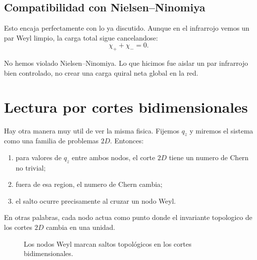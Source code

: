 \subsection{Compatibilidad con Nielsen--Ninomiya}
Esto encaja perfectamente con lo ya discutido. Aunque en el infrarrojo vemos un par Weyl limpio, la carga total sigue cancelandose:
\begin{equation}
\chi_+ + \chi_- = 0.
\end{equation}

No hemos violado Nielsen--Ninomiya. Lo que hicimos fue aislar un par infrarrojo bien controlado, no crear una carga quiral neta global en la red.

\section{Lectura por cortes bidimensionales}
Hay otra manera muy util de ver la misma fisica. Fijemos \(q_z\) y miremos el sistema como una familia de problemas \(2D\). Entonces:
\begin{enumerate}[label=\arabic*.]
    \item para valores de \(q_z\) entre ambos nodos, el corte \(2D\) tiene un numero de Chern no trivial;
    \item fuera de esa region, el numero de Chern cambia;
    \item el salto ocurre precisamente al cruzar un nodo Weyl.
\end{enumerate}

En otras palabras, cada nodo actua como punto donde el invariante topologico de los cortes \(2D\) cambia en una unidad.

\begin{figure}[h!]
\centering
{}
\caption{Los nodos Weyl marcan saltos topológicos en los cortes bidimensionales.}
\end{figure}

